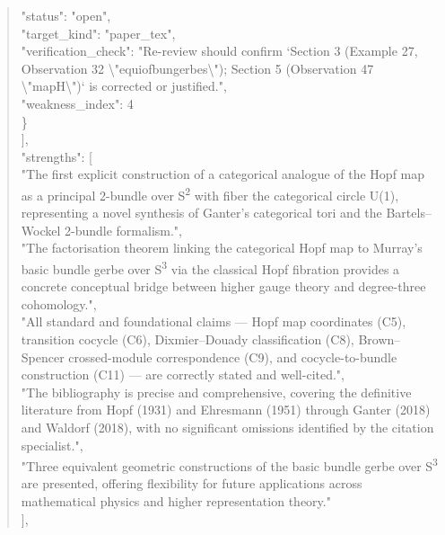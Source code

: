 \documentclass[11pt]{article}
\begin{document}
\begin{quote}
      "status": "open",\\
      "target\_kind": "paper\_tex",\\
      "verification\_check": "Re-review should confirm `Section 3 (Example 27, Observation 32 \textbackslash{}"equiofbungerbes\textbackslash{}"); Section 5 (Observation 47 \textbackslash{}"mapH\textbackslash{}")` is corrected or justified.",\\
      "weakness\_index": 4\\
    \}\\
  ],\\
  "strengths": [\\
    "The first explicit construction of a categorical analogue of the Hopf map as a principal 2-bundle over S\textsuperscript{2} with fiber the categorical circle U(1), representing a novel synthesis of Ganter's categorical tori and the Bartels--Wockel 2-bundle formalism.",\\
    "The factorisation theorem linking the categorical Hopf map to Murray's basic bundle gerbe over S\textsuperscript{3} via the classical Hopf fibration provides a concrete conceptual bridge between higher gauge theory and degree-three cohomology.",\\
    "All standard and foundational claims --- Hopf map coordinates (C5), transition cocycle (C6), Dixmier--Douady classification (C8), Brown--Spencer crossed-module correspondence (C9), and cocycle-to-bundle construction (C11) --- are correctly stated and well-cited.",\\
    "The bibliography is precise and comprehensive, covering the definitive literature from Hopf (1931) and Ehresmann (1951) through Ganter (2018) and Waldorf (2018), with no significant omissions identified by the citation specialist.",\\
    "Three equivalent geometric constructions of the basic bundle gerbe over S\textsuperscript{3} are presented, offering flexibility for future applications across mathematical physics and higher representation theory."\\
  ],\\

\end{quote}
\end{document}
